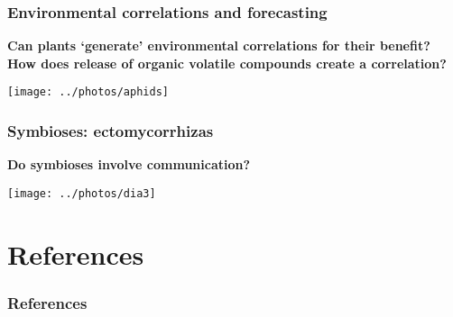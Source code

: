 \documentclass[10pt]{beamer}
\begin{document}
\begin{frame}
\frametitle{Environmental correlations and forecasting \Discussion}

\textbf{Can plants `generate' environmental correlations for their benefit?\\
How does release of organic volatile compounds create a correlation?}

    \centering
    \texttt{[image: ../photos/aphids]}
\end{frame}

\begin{frame}
\frametitle{Symbioses: ectomycorrhizas \Discussion}

\textbf{Do symbioses involve communication?}

    \centering
    \texttt{[image: ../photos/dia3]}
\end{frame}




  \section*{References}
  \begin{frame}[t,allowframebreaks]
    \frametitle{References}
    \printbibliography
  \end{frame}
\end{document}
